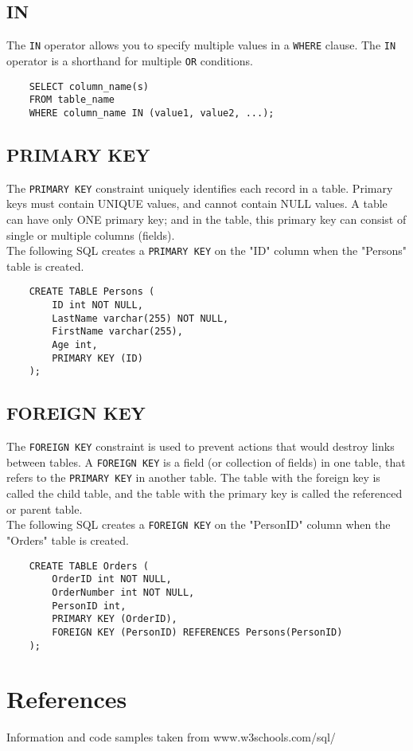 \documentclass{thomasClass}
\begin{document}
\subsection{IN}
The \verb|IN| operator allows you to specify multiple values in a \verb|WHERE| clause. The \verb|IN| operator is a shorthand for multiple \verb|OR| conditions.
\begin{verbatim}
    SELECT column_name(s)
    FROM table_name
    WHERE column_name IN (value1, value2, ...);
\end{verbatim}

\subsection{PRIMARY KEY}
The \verb|PRIMARY KEY| constraint uniquely identifies each record in a table. Primary keys must contain UNIQUE values, and cannot contain NULL values. A table can have only ONE primary key; and in the table, this primary key can consist of single or multiple columns (fields).\\
The following SQL creates a \verb|PRIMARY KEY| on the "ID" column when the "Persons" table is created.
\begin{verbatim}
    CREATE TABLE Persons (
        ID int NOT NULL,
        LastName varchar(255) NOT NULL,
        FirstName varchar(255),
        Age int,
        PRIMARY KEY (ID)
    );
\end{verbatim}

\subsection{FOREIGN KEY}
The \verb|FOREIGN KEY| constraint is used to prevent actions that would destroy links between tables. A \verb|FOREIGN KEY| is a field (or collection of fields) in one table, that refers to the \verb|PRIMARY KEY| in another table. The table with the foreign key is called the child table, and the table with the primary key is called the referenced or parent table.\\
The following SQL creates a \verb|FOREIGN KEY| on the "PersonID" column when the "Orders" table is created.
\begin{verbatim}
    CREATE TABLE Orders (
        OrderID int NOT NULL,
        OrderNumber int NOT NULL,
        PersonID int,
        PRIMARY KEY (OrderID),
        FOREIGN KEY (PersonID) REFERENCES Persons(PersonID)
    );
\end{verbatim}


\section{References}
Information and code samples taken from www.w3schools.com/sql/
\end{document}

